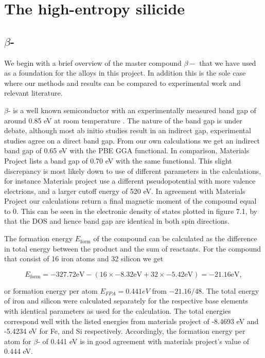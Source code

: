 \chapter{The high-entropy silicide }
\label{sec:equi}

\section{$\beta$-}
We begin with a brief overview of the master compound $\beta-$ that we have used as a foundation for the alloys in this project. In addition this is the sole case where our methods and results can be compared to experimental work and relevant literature.

$\beta$- is a well known semiconductor with an experimentally measured band gap of around 0.85 eV at room temperature \cite{PhysRevB.58.10389}. The nature of the band gap is under debate, although most ab initio studies result in an indirect gap, experimental studies agree on a direct band gap. From our own calculations we get an indirect band gap of 0.65 eV with the PBE GGA functional. In comparison, Materials Project lists a band gap of 0.70 eV with the same functional. This slight discrepancy is most likely down to use of different parameters in the calculations, for instance Materials project use a different pseudopotential with more valence electrions, and a larger cutoff energy of 520 eV. In agreement with Materials Project our calculations return a final magnetic moment of the compound equal to 0. This can be seen in the electronic density of states plotted in figure 7.1, by that the DOS and hence band gap are identical in both spin directions.   

The formation energy $E_\text{form}$ of the compound can be calculated as the difference in total energy between the product and the sum of reactants. For the  compound that consist of 16 iron atoms and 32 silicon we get 

\begin{equation*}
E_\text{form} = -327.72 \text{eV} - (16 \times -8.32 \text{eV} + 32 \times -5.42 \text{eV}) = -21.16 \text{eV}, 
\end{equation*}

or formation energy per atom $E_{FPA} = 0.441 eV$ from $-21.16/48$. The total energy of iron and silicon were calculated separately for the respective base elements with identical parameters as used for the  calculation. The total energies correspond well with the listed energies from materials project of -8.4693 eV and -5.4234 eV for Fe, and Si respectively. Accordingly, the formation energy per atom for $\beta$- of 0.441 eV is in good agreement with materials project's value of 0.444 eV.

